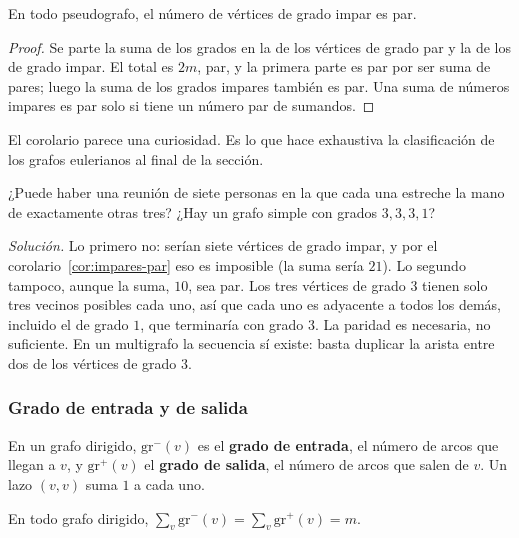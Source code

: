 \documentclass[11pt,letterpaper]{article}
\begin{document}
\begin{corolario}
  \label{cor:impares-par}
  En todo pseudografo, el número de vértices de grado impar es par.
\end{corolario}

\begin{proof}
  Se parte la suma de los grados en la de los vértices de grado par y
  la de los de grado impar. El total es $2m$, par, y la primera parte
  es par por ser suma de pares; luego la suma de los grados impares
  también es par. Una suma de números impares es par solo si tiene un
  número par de sumandos.
\end{proof}

El corolario parece una curiosidad. Es lo que hace exhaustiva la
clasificación de los grafos eulerianos al final de la sección.

\begin{ejercicio}
  \label{ej:siete-personas}
  ¿Puede haber una reunión de siete personas en la que cada una
  estreche la mano de exactamente otras tres? ¿Hay un grafo simple con
  grados $3, 3, 3, 1$?

  \textit{Solución.} Lo primero no: serían siete vértices de grado
  impar, y por el corolario~\ref{cor:impares-par} eso es imposible (la
  suma sería $21$). Lo segundo tampoco, aunque la suma, $10$, sea par.
  Los tres vértices de grado $3$ tienen solo tres vecinos posibles
  cada uno, así que cada uno es adyacente a todos los demás, incluido
  el de grado $1$, que terminaría con grado $3$. La paridad es
  necesaria, no suficiente. En un multigrafo la secuencia sí existe:
  basta duplicar la arista entre dos de los vértices de grado $3$.
\end{ejercicio}

\subsubsection*{Grado de entrada y de salida}

En un grafo dirigido, $\text{gr}^{-}(v)$ es el \textbf{grado de
entrada}, el número de arcos que llegan a $v$, y $\text{gr}^{+}(v)$ el
\textbf{grado de salida}, el número de arcos que salen de $v$. Un lazo
$(v, v)$ suma $1$ a cada uno.

\begin{proposicion}
  \label{prop:grados-dirigidos}
  En todo grafo dirigido,
  $\sum_{v} \text{gr}^{-}(v) = \sum_{v} \text{gr}^{+}(v) = m$.
\end{proposicion}
\end{document}
